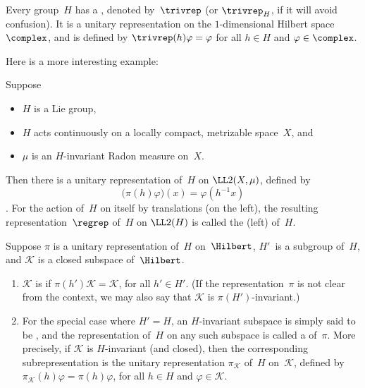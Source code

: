 \begin{eg}
Every group~$H$ has a , denoted by~$\trivrep$
(or $\trivrep_H$, if it will avoid confusion). It is a unitary representation on the $1$-dimensional Hilbert space~$\complex$, and is defined by $\trivrep(h) \varphi = \varphi$ for all $h \in H$ and $\varphi \in \complex$.
\end{eg}

Here is a more interesting example:

\begin{eg} \label{RepL2}
Suppose 
	\begin{itemize}
	\item $H$ is a Lie group,
	\item $H$ acts continuously on a locally compact, metrizable space~$X$, 
	and 
	\item $\mu$ is an $H$-invariant Radon measure on~$X$.
	\end{itemize}
Then there is a unitary representation of~$H$ on $\LL2(X,\mu)$,
defined by
	$$ \bigl( \pi(h) \varphi \bigr)(x) = \varphi(h^{-1} x) $$
.
For the action of~$H$ on itself by translations (on the left), the resulting representation~$\regrep$
of~$H$ on $\LL2(H)$ is called the (left)  of~$H$.
\end{eg}

\begin{defn} \label{OrthoCompDefn}
Suppose $\pi$ is a unitary representation of~$H$ on~$\Hilbert$, $H'$~is a subgroup of~$H$, and $\mathcal{K}$ is a closed subspace of~$\Hilbert$.
	\begin{enumerate}
	\item $\mathcal{K}$ is  if $\pi(h') \mathcal{K} = \mathcal{K}$, for all $h' \in H'$. (If the representation~$\pi$ is not clear from the context, we may also say that $\mathcal{K}$ is $\pi(H')$-invariant.)
	
	\item For the special case where $H' = H$, an $H$-invariant subspace is simply said to be , and the representation of~$H$ on any such subspace is called a  of~$\pi$. More precisely, if $\mathcal{K}$ is $H$-invariant (and closed), then the corresponding subrepresentation is the unitary representation $\pi_{\mathcal{K}}$ of~$H$ on~$\mathcal{K}$, defined by $\pi_{\mathcal{K}}(h)\varphi = \pi(h) \varphi$, for all $h \in H$ and $\varphi \in \mathcal{K}$.
	\end{enumerate}
\end{defn}

